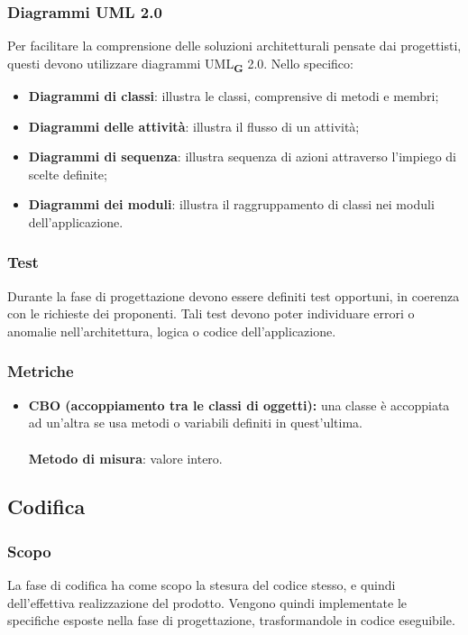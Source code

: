 \subsubsection{Diagrammi UML 2.0}
Per facilitare la comprensione delle soluzioni architetturali pensate dai progettisti, questi devono utilizzare diagrammi UML\textsubscript{\textbf{G}} 2.0.
Nello specifico:
\begin{itemize}
    \item \textbf{Diagrammi di classi}: illustra le classi, comprensive di metodi e membri;
    \item \textbf{Diagrammi delle attività}: illustra il flusso di un attività;
    \item \textbf{Diagrammi di sequenza}: illustra sequenza di azioni attraverso l'impiego di scelte definite;
    \item \textbf{Diagrammi dei moduli}: illustra il raggruppamento di classi nei moduli dell'applicazione.
\end{itemize}
\subsubsection{Test}
Durante la fase di progettazione devono essere definiti test opportuni, in coerenza con le richieste dei proponenti.
Tali test devono poter individuare errori o anomalie nell'architettura, logica o codice dell'applicazione.
\subsubsection{Metriche}
\begin{itemize}
    \item \textbf{CBO (accoppiamento tra le classi di oggetti):} una classe è accoppiata ad un'altra se usa metodi o variabili definiti in quest'ultima.\\
    \\\textbf{Metodo di misura}: valore intero.
\end{itemize}
\subsection{Codifica}
\subsubsection{Scopo}
La fase di codifica ha come scopo la stesura del codice stesso, e quindi dell'effettiva realizzazione del prodotto.
Vengono quindi implementate le specifiche esposte nella fase di progettazione, trasformandole in codice eseguibile.
